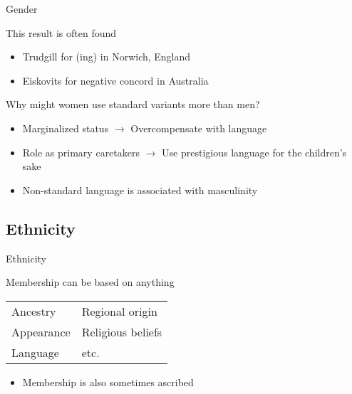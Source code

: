 \documentclass{beamer}
\newcommand{\subonefour}{Gender}
\newcommand{\subonefive}{Ethnicity}
\begin{document}
      \begin{frame}{\subonefour}
        \begin{block}{This result is often found}
          \begin{itemize}
            \item Trudgill for (ing) in Norwich, England %
            \item Eiskovits for negative concord in Australia %
          \end{itemize}
        \end{block}
        \begin{block}{Why might women use standard variants more than men?}
          \begin{itemize}
            \item<2-> Marginalized status $\rightarrow$ Overcompensate with language
            \item<2-> Role as primary caretakers $\rightarrow$ Use prestigious language for the children's sake
            \item<2-> Non-standard language is associated with masculinity
          \end{itemize}
        \end{block}
      \end{frame}

    \subsection{\subonefive}
      \begin{frame}{\subonefive}
        \begin{definition}
          
        \end{definition}
        \begin{block}{Membership can be based on anything}
          \begin{tabular}{l l}
            Ancestry   & Regional origin \\
            Appearance & Religious beliefs \\
            Language   & etc.
          \end{tabular}
          \begin{itemize}
            \item Membership is also sometimes ascribed
          \end{itemize}
        \end{block}
      \end{frame}
\end{document}
